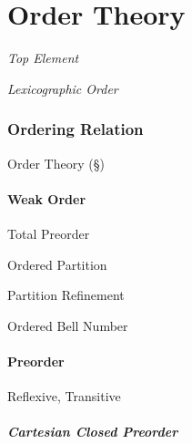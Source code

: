 \part{Order Theory}\label{sec:order_theory}

\emph{Top Element}

\emph{Lexicographic Order}



\section{Ordering Relation}\label{sec:ordering_relation}

Order Theory (\S\ref{sec:order_theory})



\subsection{Weak Order}\label{sec:weak_order}

Total Preorder

Ordered Partition

Partition Refinement %

Ordered Bell Number



\subsection{Preorder}\label{sec:preorder}

Reflexive, Transitive


\subsubsection{Cartesian Closed Preorder}\label{sec:cartesian_preorder}

